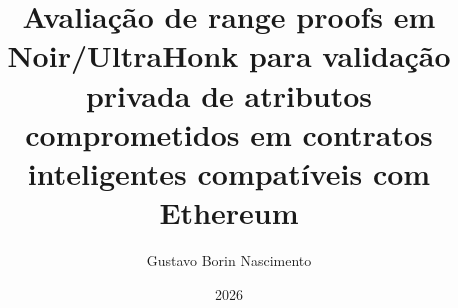 \author{Gustavo Borin Nascimento}
\title{Avaliação de range proofs em Noir/UltraHonk para validação privada de atributos comprometidos em contratos inteligentes compatíveis com Ethereum}
\date{2026}

